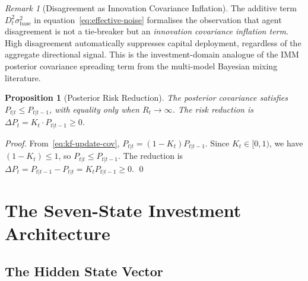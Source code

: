 \documentclass[12pt,openany]{book}
\numberwithin{equation}{chapter}
\theoremstyle{plain}
\newtheorem{proposition}[theorem]{Proposition}
\theoremstyle{definition}
\theoremstyle{remark}
\newtheorem{remark}[theorem]{Remark}
\begin{document}
\begin{remark}[Disagreement as Innovation Covariance Inflation]
\label{rem:disagreement}
The additive term $D_t^2 \sigma_{\mathrm{base}}^2$ in
equation~\eqref{eq:effective-noise} formalises the observation
that agent disagreement is not a tie-breaker but an
\emph{innovation covariance inflation term}.  High disagreement
automatically suppresses capital deployment, regardless of the
aggregate directional signal.  This is the investment-domain
analogue of the IMM posterior covariance spreading term from the
multi-model Bayesian mixing literature.
\end{remark}

\begin{proposition}[Posterior Risk Reduction]
\label{prop:risk-reduction}
The posterior covariance satisfies $P_{t|t} \leq P_{t|t-1}$, with
equality only when $R_t \to \infty$.  The risk reduction is
$\Delta P_t = K_t \cdot P_{t|t-1} \geq 0$.
\end{proposition}

\begin{proof}
From~\eqref{eq:kf-update-cov}, $P_{t|t} = (1-K_t)P_{t|t-1}$.
Since $K_t \in [0,1)$, we have $(1-K_t) \leq 1$, so
$P_{t|t} \leq P_{t|t-1}$.  The reduction is
$\Delta P_t = P_{t|t-1} - P_{t|t} = K_t P_{t|t-1} \geq 0$.
\qed
\end{proof}

\chapter{The Seven-State Investment Architecture}
\label{ch:seven-states}

\section{The Hidden State Vector}
\end{document}
